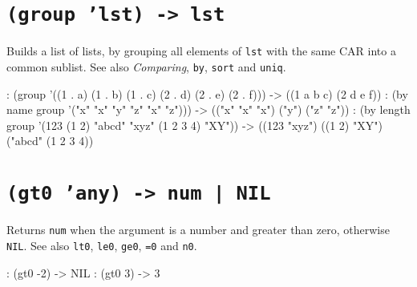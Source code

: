  
\section*{\texttt{(group 'lst) -> lst}}
\label{sec:func-ref-G-(group 'lst) -> lst}


Builds a list of lists, by grouping all elements of \texttt{lst} with the same
CAR into a common sublist. See also \emph{Comparing}, \texttt{by},
\texttt{sort} and \texttt{uniq}.


\begin{wideverbatim}
: (group '((1 . a) (1 . b) (1 . c) (2 . d) (2 . e) (2 . f)))
-> ((1 a b c) (2 d e f))
: (by name group '("x" "x" "y" "z" "x" "z")))
-> (("x" "x" "x") ("y") ("z" "z"))
: (by length group '(123 (1 2) "abcd" "xyz" (1 2 3 4) "XY"))
-> ((123 "xyz") ((1 2) "XY") ("abcd" (1 2 3 4))
\end{wideverbatim}

 
\section*{\texttt{(gt0 'any) -> num | NIL}}
\label{sec:func-ref-G-(gt0 'any) -> num | NIL}


Returns \texttt{num} when the argument is a number and greater than
zero, otherwise \texttt{NIL}. See also \texttt{lt0}, \texttt{le0},
\texttt{ge0}, \texttt{=0} and \texttt{n0}.


\begin{wideverbatim}
: (gt0 -2)
-> NIL
: (gt0 3)
-> 3
\end{wideverbatim}




% 
